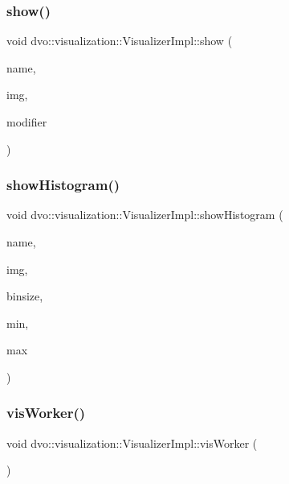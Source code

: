 \subsubsection{\texorpdfstring{show()}{show()}}
{\footnotesize\ttfamily void dvo\+::visualization\+::\+Visualizer\+Impl\+::show (\begin{DoxyParamCaption}\item[{std\+::string \&}]{name,  }\item[{const cv\+::\+Mat\+Expr \&}]{img,  }\item[{Visualizer\+::\+Image\+Modifier}]{modifier }\end{DoxyParamCaption})\hspace{0.3cm}{\ttfamily [inline]}}

\mbox{\label{classdvo_1_1visualization_1_1_visualizer_impl_a3afe414ca4a899c77458a1a0f1139dbc}} 
\subsubsection{\texorpdfstring{show\+Histogram()}{showHistogram()}}
{\footnotesize\ttfamily void dvo\+::visualization\+::\+Visualizer\+Impl\+::show\+Histogram (\begin{DoxyParamCaption}\item[{std\+::string \&}]{name,  }\item[{const cv\+::\+Mat \&}]{img,  }\item[{float}]{binsize,  }\item[{float}]{min,  }\item[{float}]{max }\end{DoxyParamCaption})\hspace{0.3cm}{\ttfamily [inline]}}

\mbox{\label{classdvo_1_1visualization_1_1_visualizer_impl_acc30618615be0c6b9d54959a1beaf5e7}} 
\subsubsection{\texorpdfstring{vis\+Worker()}{visWorker()}}
{\footnotesize\ttfamily void dvo\+::visualization\+::\+Visualizer\+Impl\+::vis\+Worker (\begin{DoxyParamCaption}{ }\end{DoxyParamCaption})\hspace{0.3cm}{\ttfamily [inline]}}



